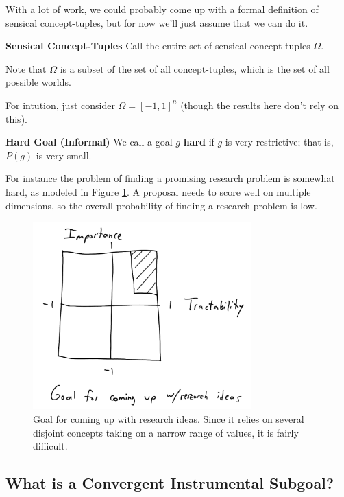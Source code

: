 \documentclass{article}
\begin{document}
With a lot of work, we could probably come up with a formal definition of sensical concept-tuples, but for now we'll just assume that we can do it.

\begin{definition}{\textbf{Sensical Concept-Tuples}}
    Call the entire set of sensical concept-tuples $\Omega$.
\end{definition}

Note that $\Omega$ is a subset of the set of all concept-tuples, which is the set of all possible worlds.


For intution, just consider $\Omega=[-1,1]^n$ (though the results here don't rely on this).

\begin{definition}{\textbf{Hard Goal (Informal)}}
    We call a goal $g$ \textbf{hard} if $g$ is very restrictive; that is, $P(g)$ is very small.
\end{definition}

For instance the problem of finding a promising research problem is somewhat hard, as modeled in Figure \ref{fig:goal-research}. A proposal needs to score well on multiple dimensions, so the overall probability of finding a research problem is low.

\begin{figure}[ht]
    \centering
    \includegraphics[width=0.75\textwidth]{pics/goal-research.png} 
    \caption{Goal for coming up with research ideas. Since it relies on several disjoint concepts taking on a narrow range of values, it is fairly difficult.}
    \label{fig:goal-research} 
\end{figure}

\subsection{What is a Convergent Instrumental Subgoal?}
\end{document}

